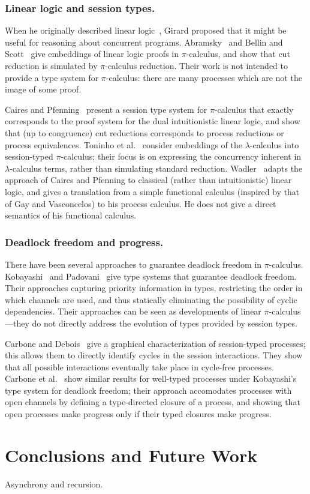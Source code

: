 \documentclass[oribibl,orivec,envcountsame]{llncs}
\begin{document}
\subsubsection{Linear logic and session types.}

When he originally described linear logic~\cite{Girard87}, Girard proposed that it might be useful
for reasoning about concurrent programs.  Abramsky~\cite{Abramsky92} and Bellin and
Scott~\cite{BellinScott94} give embeddings of linear logic proofs in $\pi$-calculus, and show that
cut reduction is simulated by $\pi$-calculus reduction.  Their work is not intended to provide a
type system for $\pi$-calculus: there are many processes which are not the image of some proof.

Caires and Pfenning~\cite{CairesPfenning10} present a session type system for $\pi$-calculus that
exactly corresponds to the proof system for the dual intuitionistic linear logic, and show that (up
to congruence) cut reductions corresponds to process reductions or process equivalences.  Toninho et
al.~\cite{ToninhoCP12} consider embeddings of the $\lambda$-calculus into session-typed
$\pi$-calculus; their focus is on expressing the concurrency inherent in $\lambda$-calculus terms,
rather than simulating standard reduction.  Wadler~\cite{Wadler14} adapts the approach of Caires and
Pfenning to classical (rather than intuitionistic) linear logic, and gives a translation from a
simple functional calculus (inspired by that of Gay and Vasconcelos) to his process calculus.  He
does not give a direct semantics of his functional calculus.

\subsubsection{Deadlock freedom and progress.}

There have been several approaches to guarantee deadlock freedom in $\pi$-calculus.
Kobayashi~\cite{Kobayashi06} and Padovani~\cite{Padovani14} give type systems that guarantee
deadlock freedom.  Their approaches capturing priority information in types, restricting the order
in which channels are used, and thus statically eliminating the possibility of cyclic dependencies.
Their approaches can be seen as developments of linear $\pi$-calculus---they do not directly address
the evolution of types provided by session types.

Carbone and Debois~\cite{Carbone10} give a graphical characterization of session-typed processes;
this allows them to directly identify cycles in the session interactions.  They show that all
possible interactions eventually take place in cycle-free processes.  Carbone et
al.~\cite{CarboneDM14} show similar results for well-typed processes under Kobayashi's type system
for deadlock freedom; their approach accomodates processes with open channels by defining a
type-directed closure of a process, and showing that open processes make progress only if their
typed closures make progress.

\section{Conclusions and Future Work}\label{sec:conclusion}

Asynchrony and recursion.

\label{sec:bib}


\end{document}
